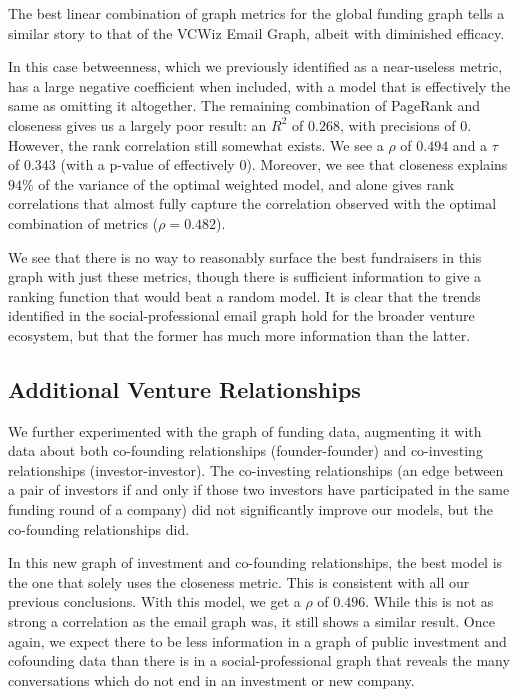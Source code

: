 The best linear combination of graph metrics for the global funding graph tells a similar story to that of the VCWiz Email Graph, albeit with diminished efficacy.

In this case betweenness, which we previously identified as a near-useless metric, has a large negative coefficient when included, with a model that is effectively the same as omitting it altogether. The remaining combination of PageRank and closeness gives us a largely poor result: an $R^2$ of $0.268$, with precisions of $0$. However, the rank correlation still somewhat exists. We see a $\rho$ of $0.494$ and a $\tau$ of $0.343$ (with a p-value of effectively $0$). Moreover, we see that closeness explains $94\%$ of the variance of the optimal weighted model, and alone gives rank correlations that almost fully capture the correlation observed with the optimal combination of metrics ($\rho = 0.482$).

We see that there is no way to reasonably surface the best fundraisers in this graph with just these metrics, though there is sufficient information to give a ranking function that would beat a random model. It is clear that the trends identified in the social-professional email graph hold for the broader venture ecosystem, but that the former has much more information than the latter.

\subsection{Additional Venture Relationships}

We further experimented with the graph of funding data, augmenting it with data about both co-founding relationships (founder-founder) and co-investing relationships (investor-investor). The co-investing relationships (an edge between a pair of investors if and only if those two investors have participated in the same funding round of a company) did not significantly improve our models, but the co-founding relationships did.

In this new graph of investment and co-founding relationships, the best model is the one that solely uses the closeness metric. This is consistent with all our previous conclusions. With this model, we get a $\rho$ of $0.496$. While this is not as strong a correlation as the email graph was, it still shows a similar result. Once again, we expect there to be less information in a graph of public investment and cofounding data than there is in a social-professional graph that reveals the many conversations which do not end in an investment or new company.

